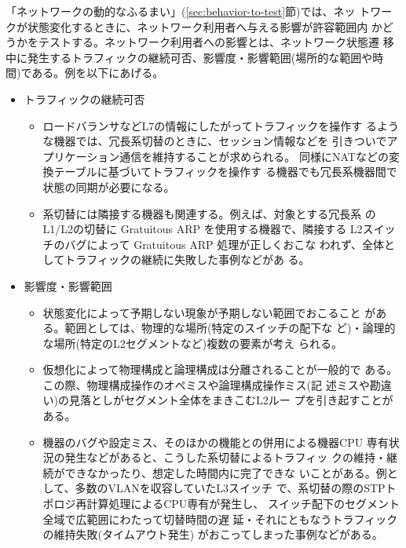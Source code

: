「ネットワークの動的なふるまい」(\ref{sec:behavior-to-test}節)では、ネッ
トワークが状態変化するときに、ネットワーク利用者へ与える影響が許容範囲内
かどうかをテストする。ネットワーク利用者への影響とは、ネットワーク状態遷
移中に発生するトラフィックの継続可否、影響度・影響範囲(場所的な範囲や時
間)である。例を以下にあげる。
\begin{itemize}
 \item トラフィックの継続可否
       \begin{itemize}
        \item ロードバランサなどL7の情報にしたがってトラフィックを操作す
              るような機器では、冗長系切替のときに、セッション情報などを
              引きついでアプリケーション通信を維持することが求められる。
              同様にNATなどの変換テーブルに基づいてトラフィックを操作す
              る機器でも冗長系機器間で状態の同期が必要になる。
        \item 系切替には隣接する機器も関連する。例えば、対象とする冗長系
              のL1/L2の切替に Gratuitous ARP を使用する機器で、隣接する
              L2スイッチのバグによって Gratuitous ARP 処理が正しくおこな
              われず、全体としてトラフィックの継続に失敗した事例などがあ
              る。
       \end{itemize}
 \item 影響度・影響範囲
       \begin{itemize}
        \item 状態変化によって予期しない現象が予期しない範囲でおこること
              がある。範囲としては、物理的な場所(特定のスイッチの配下な
              ど)・論理的な場所(特定のL2セグメントなど)複数の要素が考え
              られる。
        \item 仮想化によって物理構成と論理構成は分離されることが一般的で
              ある。この際、物理構成操作のオペミスや論理構成操作ミス(記
              述ミスや勘違い)の見落としがセグメント全体をまきこむL2ルー
              プを引き起すことがある。
        \item 機器のバグや設定ミス、そのほかの機能との併用による機器CPU
              専有状況の発生などがあると、こうした系切替によるトラフィッ
              クの維持・継続ができなかったり、想定した時間内に完了できな
              いことがある。例として、多数のVLANを収容していたL3スイッチ
              で、系切替の際のSTPトポロジ再計算処理によるCPU専有が発生し、
              スイッチ配下のセグメント全域で広範囲にわたって切替時間の遅
              延・それにともなうトラフィックの維持失敗(タイムアウト発生)
              がおこってしまった事例などがある。
       \end{itemize}
\end{itemize}

